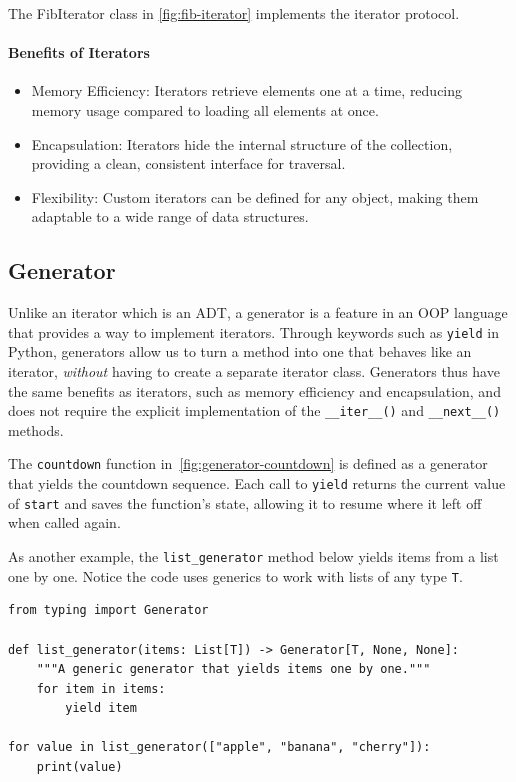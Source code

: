 \documentclass[oneside,11pt,dvipsnames]{book}
\newcommand{\code}[1]{\texttt{#1}}
\begin{document}
The FibIterator class in \autoref{fig:fib-iterator} implements the iterator protocol.  



\paragraph{Benefits of Iterators}
\begin{itemize}
\item Memory Efficiency: Iterators retrieve elements one at a time, reducing memory usage compared to loading all elements at once.
\item Encapsulation: Iterators hide the internal structure of the collection, providing a clean, consistent interface for traversal.
\item Flexibility: Custom iterators can be defined for any object, making them adaptable to a wide range of data structures.
\end{itemize}


\subsection{Generator}\label{sec:generators}
Unlike an iterator which is an ADT, a generator is a feature in an OOP language that provides a way to implement iterators. Through keywords such as \code{yield} in Python, generators allow us to turn a method into one that behaves like an iterator, \emph{without} having to create a separate iterator class. Generators thus have the same benefits as iterators, such as memory efficiency and encapsulation, and does not require the explicit implementation of the \code{\_\_iter\_\_()} and \code{\_\_next\_\_()} methods.

The \code{countdown} function in~\autoref{fig:generator-countdown} is defined as a generator that yields the countdown sequence.
Each call to \code{yield} returns the current value of \code{start} and saves the function's state, allowing it to resume where it left off when called again.

As another example, the \code{list\_generator} method below yields items from a list one by one. Notice the code uses generics to work with lists of any type \code{T}.

\begin{lstlisting}
from typing import Generator

def list_generator(items: List[T]) -> Generator[T, None, None]:
    """A generic generator that yields items one by one."""
    for item in items:
        yield item

for value in list_generator(["apple", "banana", "cherry"]):
    print(value)
\end{lstlisting}
\end{document}
